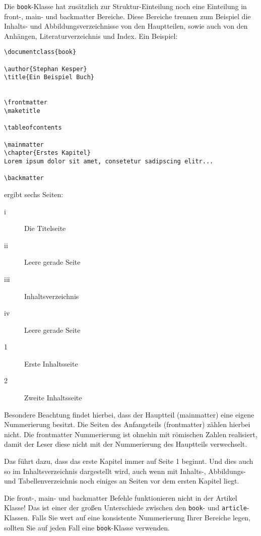 Die \texttt{book}-Klasse hat zusätzlich zur Struktur-Einteilung noch eine Einteilung in front-, main- und backmatter Bereiche. Diese Bereiche trennen zum Beispiel die Inhalts- und Abbildungsverzeichnisse von den Hauptteilen, sowie auch von den Anhängen, Literaturverzeichnis und Index. Ein Beispiel:

\footnotesize
\begin{verbatim}
\documentclass{book}

\author{Stephan Kesper}
\title{Ein Beispiel Buch}


\frontmatter
\maketitle

\tableofcontents

\mainmatter
\chapter{Erstes Kapitel}
Lorem ipsum dolor sit amet, consetetur sadipscing elitr...

\backmatter

\end{verbatim}
\normalsize
ergibt sechs Seiten:
\begin{description}
\item[i] Die Titelseite
\item[ii] Leere gerade Seite
\item[iii] Inhaltsverzeichnis
\item[iv] Leere gerade Seite
\item[1] Erste Inhaltsseite
\item[2] Zweite Inhaltsseite
\end{description}



Besondere Beachtung findet hierbei, dass der Hauptteil (mainmatter) eine eigene Nummerierung besitzt. Die Seiten des Anfangsteils (frontmatter) zählen hierbei nicht. Die frontmatter Nummerierung ist ohnehin mit römischen Zahlen realisiert, damit der Leser diese nicht mit der Nummerierung des Hauptteils verwechselt. 

Das führt dazu, dass das erste Kapitel immer auf Seite 1 beginnt. Und dies auch so im Inhaltsverzeichnis dargestellt wird, auch wenn mit Inhalts-, Ab\-bil\-dungs- und Tabellenverzeichnis noch einiges an Seiten vor dem ersten Kapitel liegt. 

\begin{fancyquotes}
Die front-, main- und backmatter Befehle funktionieren nicht in der Artikel Klasse! Das ist einer der großen Unterschiede zwischen den \texttt{book}- und \texttt{article}-Klassen. Falls Sie wert auf eine konsistente Nummerierung Ihrer Bereiche legen, sollten Sie auf jeden Fall eine \texttt{book}-Klasse verwenden.
\end{fancyquotes}

